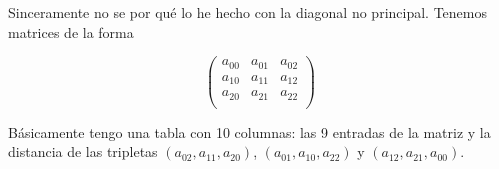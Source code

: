 \documentclass{article}
\begin{document}
Sinceramente no se por qué lo he hecho con la diagonal no principal. Tenemos matrices de la forma

$$
\begin{pmatrix}
    a_{00} & a_{01} & a_{02} \\
    a_{10} & a_{11} & a_{12} \\
    a_{20} & a_{21} & a_{22} \\
\end{pmatrix}
$$

Básicamente tengo una tabla con 10 columnas: las 9 entradas de la matriz y la distancia de las tripletas $(a_{02}, a_{11}, a_{20})$, $(a_{01}, a_{10}, a_{22})$ y $(a_{12}, a_{21}, a_{00})$. 







\end{document}
